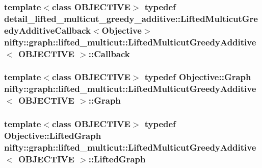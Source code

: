 \subsubsection[{Callback}]{\setlength{\rightskip}{0pt plus 5cm}template$<$class O\+B\+J\+E\+C\+T\+I\+V\+E$>$ typedef detail\+\_\+lifted\+\_\+multicut\+\_\+greedy\+\_\+additive\+::\+Lifted\+Multicut\+Greedy\+Additive\+Callback$<${\bf Objective}$>$ {\bf nifty\+::graph\+::lifted\+\_\+multicut\+::\+Lifted\+Multicut\+Greedy\+Additive}$<$ O\+B\+J\+E\+C\+T\+I\+V\+E $>$\+::{\bf Callback}}\label{classnifty_1_1graph_1_1lifted__multicut_1_1LiftedMulticutGreedyAdditive_a0f298ccab4ca174bb91fd3026b473b5f}
\hypertarget{classnifty_1_1graph_1_1lifted__multicut_1_1LiftedMulticutGreedyAdditive_abb83ade2fb95c974b3648e411532c872}{}
\subsubsection[{Graph}]{\setlength{\rightskip}{0pt plus 5cm}template$<$class O\+B\+J\+E\+C\+T\+I\+V\+E$>$ typedef Objective\+::\+Graph {\bf nifty\+::graph\+::lifted\+\_\+multicut\+::\+Lifted\+Multicut\+Greedy\+Additive}$<$ O\+B\+J\+E\+C\+T\+I\+V\+E $>$\+::{\bf Graph}}\label{classnifty_1_1graph_1_1lifted__multicut_1_1LiftedMulticutGreedyAdditive_abb83ade2fb95c974b3648e411532c872}
\hypertarget{classnifty_1_1graph_1_1lifted__multicut_1_1LiftedMulticutGreedyAdditive_a5e61ec608c41b4768cf339e966e8fb7f}{}
\subsubsection[{Lifted\+Graph}]{\setlength{\rightskip}{0pt plus 5cm}template$<$class O\+B\+J\+E\+C\+T\+I\+V\+E$>$ typedef Objective\+::\+Lifted\+Graph {\bf nifty\+::graph\+::lifted\+\_\+multicut\+::\+Lifted\+Multicut\+Greedy\+Additive}$<$ O\+B\+J\+E\+C\+T\+I\+V\+E $>$\+::{\bf Lifted\+Graph}}\label{classnifty_1_1graph_1_1lifted__multicut_1_1LiftedMulticutGreedyAdditive_a5e61ec608c41b4768cf339e966e8fb7f}
\hypertarget{classnifty_1_1graph_1_1lifted__multicut_1_1LiftedMulticutGreedyAdditive_aeb295097f2ca8a7f9cf0770df94c17ab}{}
